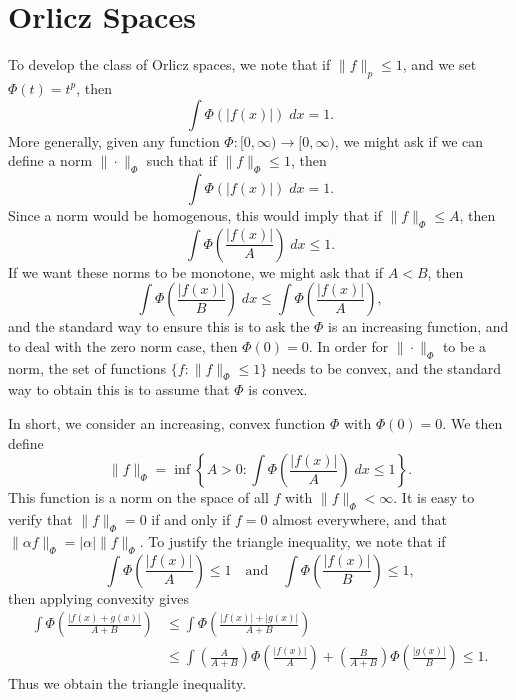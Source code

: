 \section{Orlicz Spaces}

To develop the class of Orlicz spaces, we note that if $\| f \|_p \leq 1$, and we set $\Phi(t) = t^p$, then
%
\[ \int \Phi \left( |f(x)| \right)\; dx = 1. \]
%
More generally, given any function $\Phi: [0,\infty) \to [0,\infty)$, we might ask if we can define a norm $\| \cdot \|_\Phi$ such that if $\| f \|_\Phi \leq 1$, then
%
\[ \int \Phi \left( |f(x)| \right)\; dx = 1. \]
%
Since a norm would be homogenous, this would imply that if $\| f \|_\Phi \leq A$, then
%
\[ \int \Phi \left( \frac{|f(x)|}{A} \right)\; dx \leq 1. \]
%
If we want these norms to be monotone, we might ask that if $A < B$, then
%
\[ \int \Phi \left( \frac{|f(x)|}{B} \right)\; dx \leq \int \Phi \left( \frac{|f(x)|}{A} \right), \]
%
and the standard way to ensure this is to ask the $\Phi$ is an increasing function, and to deal with the zero norm case, then $\Phi(0) = 0$. In order for $\| \cdot \|_\Phi$ to be a norm, the set of functions $\{ f : \| f \|_\Phi \leq 1 \}$ needs to be convex, and the standard way to obtain this is to assume that $\Phi$ is convex.

In short, we consider an increasing, convex function $\Phi$ with $\Phi(0) = 0$. We then define
%
\[ \| f \|_\Phi = \inf \left\{ A > 0 : \int \Phi \left( \frac{|f(x)|}{A} \right)\; dx \leq 1 \right\}. \]
%
This function is a norm on the space of all $f$ with $\| f \|_\Phi < \infty$. It is easy to verify that $\| f \|_\Phi = 0$ if and only if $f = 0$ almost everywhere, and that $\| \alpha f \|_\Phi = |\alpha| \| f \|_\Phi$. To justify the triangle inequality, we note that if
%
\[ \int \Phi \left( \frac{|f(x)|}{A} \right) \leq 1 \quad\text{and} \quad \int \Phi \left( \frac{|f(x)|}{B} \right) \leq 1, \]
%
then applying convexity gives
%
\begin{align*}
    \int \Phi \left( \frac{|f(x) + g(x)|}{A + B} \right) &\leq \int \Phi \left( \frac{|f(x)| + |g(x)|}{A + B} \right)\\
    &\leq \int \left( \frac{A}{A + B} \right) \Phi \left( \frac{|f(x)|}{A} \right) + \left( \frac{B}{A + B} \right) \Phi \left( \frac{|g(x)|}{B} \right) \leq 1.
\end{align*}
%
Thus we obtain the triangle inequality.

